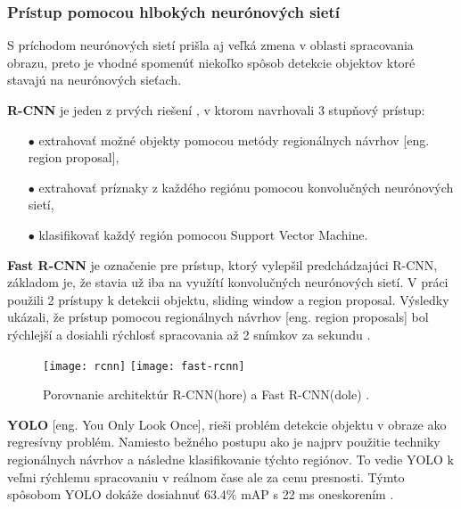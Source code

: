 \subsubsection{Prístup pomocou hlbokých neurónových sietí}
S príchodom neurónových sietí prišla aj veľká zmena v oblasti spracovania obrazu, preto je vhodné spomenúť niekoľko spôsob
    detekcie objektov ktoré stavajú na neurónových sieťach.

\textbf{R-CNN} je jeden z prvých riešení \cite{prop:rcnn}, v ktorom navrhovali 3 stupňový prístup:
\begin{enumerate}
	\item[$\bullet$] extrahovať možné objekty pomocou metódy regionálnych návrhov [eng. region proposal],
    \item[$\bullet$] extrahovať príznaky z každého regiónu pomocou konvolučných neurónových sietí,
    \item[$\bullet$] klasifikovať každý región pomocou Support Vector Machine.
\end{enumerate}

\textbf{Fast R-CNN} je označenie pre prístup, ktorý vylepšil predchádzajúci R-CNN, základom je, že stavia už iba na využítí konvolučných neurónových sietí.
V práci použili 2 prístupy k detekcii objektu, sliding window a region proposal.
Výsledky ukázali, že prístup pomocou regionálnych návrhov [eng. region proposals] bol rýchlejší a dosiahli rýchlosť spracovania až 2 snímkov za sekundu \cite{prop:fast-rcnn}.
\begin{figure}[H]
    \centering
    \texttt{[image: rcnn]}
    \qquad
    \texttt{[image: fast-rcnn]}
    \caption{Porovnanie architektúr R-CNN(hore) a Fast R-CNN(dole) \cite{odkaz:ObjectDetectionOverview}.}
    \label{pic:FastRCNN}
\end{figure}

\textbf{YOLO} [eng. You Only Look Once], rieši problém detekcie objektu v obraze ako regresívny problém.
Namiesto bežného postupu ako je najprv použitie techniky regionálnych návrhov a následne klasifikovanie týchto regiónov.
To vedie YOLO k veľmi rýchlemu spracovaniu v reálnom čase ale za cenu presnosti.
Týmto spôsobom YOLO dokáže dosiahnuť 63.4\% mAP s 22 ms oneskorením \cite{prop:Redmon2016YouOL}.

